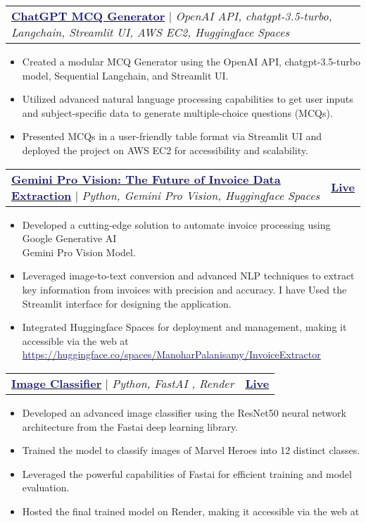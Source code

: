 \documentclass[letterpaper,11pt]{article}
\makeatletter
\newcommand{\resumeItem}[1]{
  \item\small{
    {#1 \vspace{-2pt}}
  }
}
\newcommand{\resumeProjectHeading}[2]{
    \item
    \begin{tabular*}{1.001\textwidth}{l@{\extracolsep{\fill}}r}
      \small#1 & \textbf{\small #2}\\
    \end{tabular*}\vspace{-7pt}
}
\newcommand{\resumeItemListStart}{\begin{itemize}}
\newcommand{\resumeItemListEnd}{\end{itemize}\vspace{-5pt}}
\makeatother
\begin{document}
         \resumeProjectHeading
         {\textbf{\href{https://github.com/send2manoo/ChatGPT-MCQ-Generator}{\textcolor{MidnightBlue}{ChatGPT MCQ Generator}}} $|$ \emph{OpenAI API, chatgpt-3.5-turbo, Langchain, Streamlit UI, AWS EC2, Huggingface Spaces}}{}
         \resumeItemListStart
             \resumeItem{Created a modular MCQ Generator using the OpenAI API, chatgpt-3.5-turbo model, Sequential Langchain, and Streamlit UI.}
             \resumeItem{Utilized advanced natural language processing capabilities to get user inputs and subject-specific data to generate multiple-choice questions (MCQs).}
             \resumeItem{Presented MCQs in a user-friendly table format via Streamlit UI and deployed the project on AWS EC2 for accessibility and scalability.}
         \resumeItemListEnd
         \vspace{-13pt}

         \resumeProjectHeading
        {\textbf{\href{https://huggingface.co/spaces/ManoharPalanisamy/InvoiceExtractor}{\textcolor{MidnightBlue}{Gemini Pro Vision: The Future of Invoice Data Extraction}}} $|$ \emph{Python, Gemini Pro Vision, Huggingface Spaces}} {\href{https://huggingface.co/spaces/ManoharPalanisamy/InvoiceExtractor}{\textcolor{MidnightBlue}{Live}}}
        \resumeItemListStart
          \resumeItem{Developed a cutting-edge solution to automate invoice processing using Google Generative AI \\ Gemini Pro Vision Model.}
          \resumeItem{Leveraged image-to-text conversion and advanced NLP techniques to extract key information from invoices with precision and accuracy. I have Used the Streamlit interface for designing the application.}
          \resumeItem{Integrated Huggingface Spaces for deployment and management, making it accessible via the web at {\href{https://huggingface.co/spaces/ManoharPalanisamy/InvoiceExtractor}{\textcolor{MidnightBlue}{https://huggingface.co/spaces/ManoharPalanisamy/InvoiceExtractor}}}}
         \resumeItemListEnd
         \vspace{-13pt}

     
      \resumeProjectHeading
      {\textbf{\href{http://project.decodeai.in}{\textcolor{MidnightBlue}{Image Classifier}}} $|$ \emph{Python, FastAI , Render}} {\href{http://project.decodeai.in}{\textcolor{MidnightBlue}{Live}}}
          \resumeItemListStart
            \resumeItem{Developed an advanced image classifier using the ResNet50 neural network architecture from the Fastai deep learning library.}
            \resumeItem{Trained the model to classify images of Marvel Heroes into 12 distinct classes.}
            \resumeItem{Leveraged the powerful capabilities of Fastai for efficient training and model evaluation.}
           \resumeItem{Hosted the final trained model on Render, making it accessible via the web at  \href{http://project.decodeai.in}{\color{MidnightBlue}{https://project.decodeai.in}}}
           \resumeItemListEnd
          \vspace{-13pt}
\end{document}
